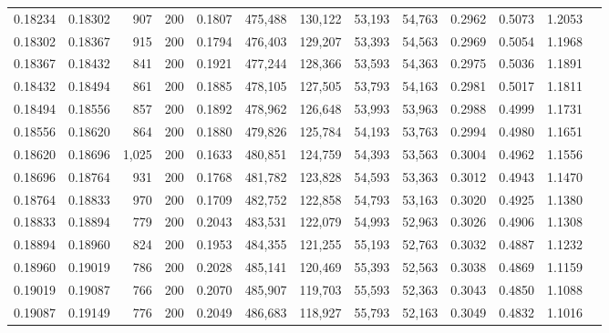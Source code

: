 \begin{tabular}{rrrrrrrrrrrrr}
0.18234 & 0.18302 &   907 & 200 &                                     0.1807 & 475,488 & 130,122 &  53,193 &  54,763 & 0.2962 & 0.5073 & 1.2053 \\
0.18302 & 0.18367 &   915 & 200 &                                     0.1794 & 476,403 & 129,207 &  53,393 &  54,563 & 0.2969 & 0.5054 & 1.1968 \\
0.18367 & 0.18432 &   841 & 200 &                                     0.1921 & 477,244 & 128,366 &  53,593 &  54,363 & 0.2975 & 0.5036 & 1.1891 \\
0.18432 & 0.18494 &   861 & 200 &                                     0.1885 & 478,105 & 127,505 &  53,793 &  54,163 & 0.2981 & 0.5017 & 1.1811 \\
0.18494 & 0.18556 &   857 & 200 &                                     0.1892 & 478,962 & 126,648 &  53,993 &  53,963 & 0.2988 & 0.4999 & 1.1731 \\
0.18556 & 0.18620 &   864 & 200 &                                     0.1880 & 479,826 & 125,784 &  54,193 &  53,763 & 0.2994 & 0.4980 & 1.1651 \\
0.18620 & 0.18696 & 1,025 & 200 &                                     0.1633 & 480,851 & 124,759 &  54,393 &  53,563 & 0.3004 & 0.4962 & 1.1556 \\
0.18696 & 0.18764 &   931 & 200 &                                     0.1768 & 481,782 & 123,828 &  54,593 &  53,363 & 0.3012 & 0.4943 & 1.1470 \\
0.18764 & 0.18833 &   970 & 200 &                                     0.1709 & 482,752 & 122,858 &  54,793 &  53,163 & 0.3020 & 0.4925 & 1.1380 \\
0.18833 & 0.18894 &   779 & 200 &                                     0.2043 & 483,531 & 122,079 &  54,993 &  52,963 & 0.3026 & 0.4906 & 1.1308 \\
0.18894 & 0.18960 &   824 & 200 &                                     0.1953 & 484,355 & 121,255 &  55,193 &  52,763 & 0.3032 & 0.4887 & 1.1232 \\
0.18960 & 0.19019 &   786 & 200 &                                     0.2028 & 485,141 & 120,469 &  55,393 &  52,563 & 0.3038 & 0.4869 & 1.1159 \\
0.19019 & 0.19087 &   766 & 200 &                                     0.2070 & 485,907 & 119,703 &  55,593 &  52,363 & 0.3043 & 0.4850 & 1.1088 \\
0.19087 & 0.19149 &   776 & 200 &                                     0.2049 & 486,683 & 118,927 &  55,793 &  52,163 & 0.3049 & 0.4832 & 1.1016 \\

\end{tabular}
